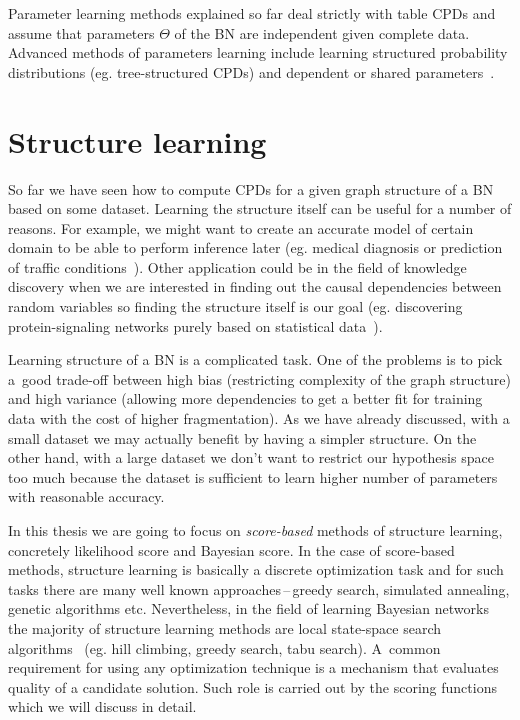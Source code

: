 \documentclass[english,cover]{fitthesis} %
\newcommand{\term}[1]{\emph{#1}}           %
\begin{document}
\medskip

Parameter learning methods explained so far deal strictly with table CPDs and assume that parameters $\Theta$ of the BN are independent given complete data. Advanced methods of parameters learning include learning structured probability distributions (eg. tree-structured CPDs) and dependent or shared parameters~\cite{pgm}.












\section{Structure learning}
So far we have seen how to compute CPDs for a given graph structure of a BN based on some dataset. Learning the structure itself can be useful for a number of reasons. For example, we might want to create an accurate model of certain domain to be able to perform inference later (eg. medical diagnosis or prediction of traffic conditions~\cite{horvitz05}). Other application could be in the field of knowledge discovery when we are interested in finding out the causal dependencies between random variables so finding the structure itself is our goal (eg. discovering protein-signaling networks purely based on statistical data~\cite{sachs05}).

Learning structure of a BN is a complicated task. One of the problems is to pick a~good trade-off between high bias (restricting complexity of the graph structure) and high variance (allowing more dependencies to get a better fit for training data with the cost of higher fragmentation). As we have already discussed, with a small dataset we may actually benefit by having a simpler structure. On the other hand, with a large dataset we don't want to restrict our hypothesis space too much because the dataset is sufficient to learn higher number of parameters with reasonable accuracy.

In this thesis we are going to focus on \term{score-based} methods of structure learning, concretely likelihood score and Bayesian score. In the case of score-based methods, structure learning is basically a discrete optimization task and for such tasks there are many well known approaches\,--\,greedy search, simulated annealing, genetic algorithms etc. Nevertheless, in the field of learning Bayesian networks the majority of structure learning methods are local state-space search algorithms~\cite[p.~814]{pgm} (eg. hill climbing, greedy search, tabu search). A~common requirement for using any optimization technique is a mechanism that evaluates quality of a candidate solution. Such role is carried out by the scoring functions which we will discuss in detail.
\end{document}
